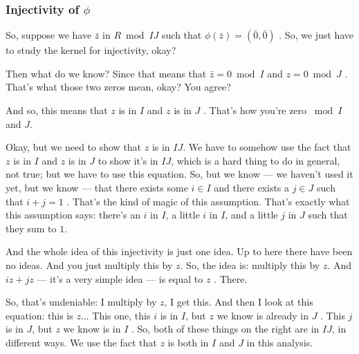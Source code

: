 \begin{proofWrapper}

\subsubsection{Injectivity of \texorpdfstring{$\phi$}{phi}}

\begin{speech}[00:06:11 - 00:07:50]
So, suppose we have $\bar{z}$ in $R \bmod IJ$  such that $\phi(\bar{z}) = (\bar{0}, \bar{0})$ . So, we just have to study the kernel for injectivity, okay?

Then what do we know? Since that means that $\bar{z} = 0 \bmod I$ and $z = 0 \bmod J$ . That's what those two zeros mean, okay? You agree?

And so, this means that $z$ is in $I$ and $z$ is in $J$ . That's how you're zero $\bmod I$ and $J$.

Okay, but we need to show that $z$ is in $IJ$. We have to somehow use the fact that $z$ is in $I$ and $z$ is in $J$ to show it's in $IJ$, which is a hard thing to do in general, not true; but we have to use this equation. So, but we know --- we haven't used it yet, but we know --- that there exists some $i \in I$ and there exists a $j \in J$ such that $i + j = 1$ . That's the kind of magic of this assumption. That's exactly what this assumption says: there's an $i$ in $I$, a little $i$ in $I$, and a little $j$ in $J$ such that they sum to $1$.
\end{speech}

\begin{speech}[00:07:50 - 00:09:25]
And the whole idea of this injectivity is just one idea. Up to here there have been no ideas. And you just multiply this by $z$. So, the idea is: multiply this by $z$. And $iz + jz$ --- it's a very simple idea --- is equal to $z$ . There.

So, that's undeniable: I multiply by $z$, I get this. And then I look at this equation: this is $z$... This one, this $i$ is in $I$, but $z$ we know is already in $J$ . This $j$ is in $J$, but $z$ we know is in $I$ . So, both of these things on the right are in $IJ$, in different ways. We use the fact that $z$ is both in $I$ and $J$ in this analysis.


\end{speech}
\end{proofWrapper}
